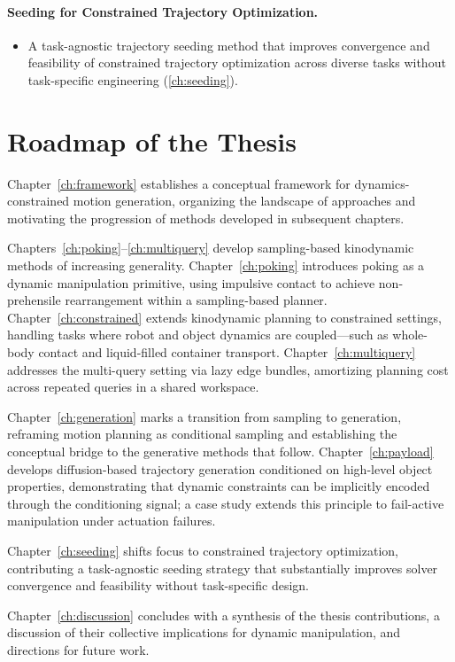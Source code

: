 \paragraph{Seeding for Constrained Trajectory Optimization.}
\begin{itemize}
  \item A task-agnostic trajectory seeding method that improves convergence and feasibility of constrained trajectory optimization across diverse tasks without task-specific engineering (\cref{ch:seeding}).
\end{itemize}

\section{Roadmap of the Thesis}
\label{sec:intro:roadmap}

Chapter~\ref{ch:framework} establishes a conceptual framework for dynamics-constrained motion generation, organizing the landscape of approaches and motivating the progression of methods developed in subsequent chapters.

Chapters~\ref{ch:poking}--\ref{ch:multiquery} develop sampling-based kinodynamic methods of increasing generality.
Chapter~\ref{ch:poking} introduces poking as a dynamic manipulation primitive, using impulsive contact to achieve non-prehensile rearrangement within a sampling-based planner.
Chapter~\ref{ch:constrained} extends kinodynamic planning to constrained settings, handling tasks where robot and object dynamics are coupled---such as whole-body contact and liquid-filled container transport.
Chapter~\ref{ch:multiquery} addresses the multi-query setting via lazy edge bundles, amortizing planning cost across repeated queries in a shared workspace.

Chapter~\ref{ch:generation} marks a transition from sampling to generation, reframing motion planning as conditional sampling and establishing the conceptual bridge to the generative methods that follow.
Chapter~\ref{ch:payload} develops diffusion-based trajectory generation conditioned on high-level object properties, demonstrating that dynamic constraints can be implicitly encoded through the conditioning signal; a case study extends this principle to fail-active manipulation under actuation failures.

Chapter~\ref{ch:seeding} shifts focus to constrained trajectory optimization, contributing a task-agnostic seeding strategy that substantially improves solver convergence and feasibility without task-specific design.

Chapter~\ref{ch:discussion} concludes with a synthesis of the thesis contributions, a discussion of their collective implications for dynamic manipulation, and directions for future work.
